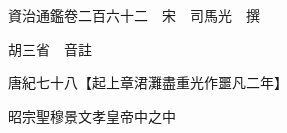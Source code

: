 










 


 
 


 

  
  
  
  
  





  
  
  
  
  
 
  

  

  
  
  



  

 
 

  
   




  

  
  


  　　資治通鑑卷二百六十二　宋　司馬光　撰

　　胡三省　音註

　　唐紀七十八【起上章涒灘盡重光作噩凡二年】

　　昭宗聖穆景文孝皇帝中之中

